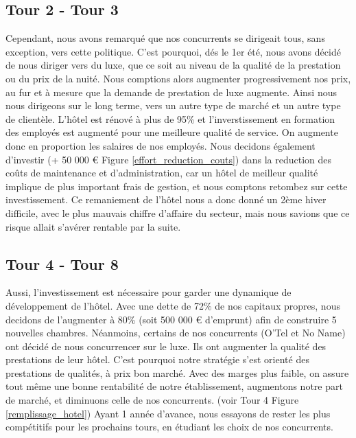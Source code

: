 \documentclass[a4paper,10pt]{article}
\begin{document}
    \subsection{Tour 2 - Tour 3}
      Cependant, nous avons remarqué que nos concurrents se dirigeait tous, sans exception, vers cette politique.
      C'est pourquoi, dés le 1er été, nous avons décidé de nous diriger vers du luxe,
      que ce soit au niveau de la qualité de la prestation ou du prix de la nuité.
      \newline
      \newline
      Nous comptions alors augmenter progressivement nos prix, au fur et à mesure que la demande de prestation de luxe augmente.
      Ainsi nous nous dirigeons sur le long terme, vers un autre type de marché et un autre type de clientèle.
      L’hôtel est rénové à plus de 95\% et l'inverstissement en formation des employés est augmenté pour une meilleure qualité de service.
      On augmente donc en proportion les salaires de nos employés.
      \newline
      \newline
      Nous decidons également d'investir (+ 50 000 \euro{} Figure \ref{effort_reduction_couts}) dans la reduction des coûts de maintenance et d'administration,
      car un hôtel de meilleur qualité implique de plus important frais de gestion, et nous comptons retombez sur cette investissement.
      \newline
      \newline
      Ce remaniement de l'hôtel nous a donc donné un 2ème hiver difficile, avec le plus mauvais chiffre d'affaire du secteur,
      mais nous savions que ce risque allait s'avérer rentable par la suite.

    \subsection{Tour 4 - Tour 8}
      Aussi,  l’investissement est nécessaire pour garder une dynamique de développement de l’hôtel. Avec une dette de 72\% de nos capitaux propres,
      nous decidons de l'augmenter à 80\% (soit 500 000 \euro{} d'emprunt) afin de construire 5 nouvelles chambres.
      \newline
      \newline
      Néanmoins, certains de nos concurrents (O'Tel et No Name) ont décidé de nous concurrencer sur le luxe.
      Ils ont augmenter la qualité des prestations de leur hôtel.
      C’est pourquoi notre stratégie s’est orienté des prestations de qualités, à prix bon marché.
      Avec des marges plus faible, on assure tout même une bonne rentabilité de notre établissement,
      augmentons notre part de marché, et diminuons celle de nos concurrents. (voir Tour 4 Figure \ref{remplissage_hotel})
      \newline
      \newline
      Ayant 1 année d'avance, nous essayons de rester les plus compétitifs pour les prochains tours, en étudiant les choix de nos concurrents.
\end{document}
